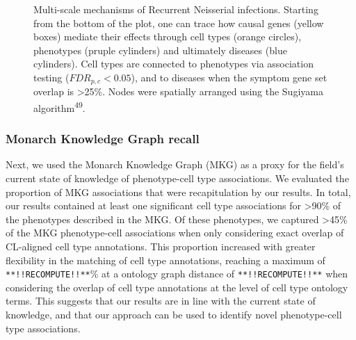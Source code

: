 \documentclass[
sn-nature
]{sn-jnl}
\begin{document}
\label{cell-fig-network-rni}
\begin{figure}[H]


\caption{\label{fig-network-rni}Multi-scale mechanisms of Recurrent
Neisserial infections. Starting from the bottom of the plot, one can
trace how causal genes (yellow boxes) mediate their effects through cell
types (orange circles), phenotypes (pruple cylinders) and ultimately
diseases (blue cylinders). Cell types are connected to phenotypes via
association testing (\(FDR_{p,c}<0.05\)), and to diseases when the
symptom gene set overlap is \textgreater25\%. Nodes were spatially
arranged using the Sugiyama algorithm\textsuperscript{49}.}

\end{figure}%

\subsubsection{Monarch Knowledge Graph
recall}\label{monarch-knowledge-graph-recall}

Next, we used the Monarch Knowledge Graph (MKG) as a proxy for the
field's current state of knowledge of phenotype-cell type associations.
We evaluated the proportion of MKG associations that were recapitulation
by our results. In total, our results contained at least one significant
cell type associations for \textgreater90\% of the phenotypes described
in the MKG. Of these phenotypes, we captured \textgreater45\% of the MKG
phenotype-cell associations when only considering exact overlap of
CL-aligned cell type annotations. This proportion increased with greater
flexibility in the matching of cell type annotations, reaching a maximum
of \texttt{**!!RECOMPUTE!!**}\% at a ontology graph distance of
\texttt{**!!RECOMPUTE!!**} when considering the overlap of cell type
annotations at the level of cell type ontology terms. This suggests that
our results are in line with the current state of knowledge, and that
our approach can be used to identify novel phenotype-cell type
associations.
\end{document}
